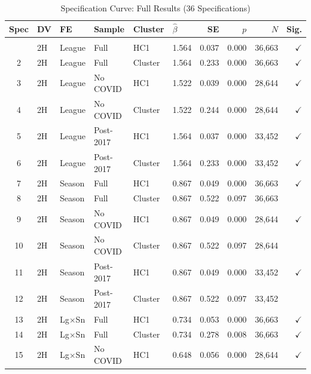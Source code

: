 
\begin{table}[htbp]
\centering
\begin{threeparttable}
\caption{Specification Curve: Full Results (36 Specifications)}
\label{tab:spec_curve_full}
\small
\begin{tabular}{clllllrrrr}
\toprule
Spec & DV & FE & Sample & Cluster & $\hat{\beta}$ & SE & $p$ & $N$ & Sig. \\
\midrule
\addlinespace
\multicolumn{10}{l}{\textit{Panel A: 2H stoppage time}} \\
\addlinespace[3pt]
1 & 2H & League & Full & HC1 & 1.564 & 0.037 & 0.000 & 36,663 & $\checkmark$ \\
2 & 2H & League & Full & Cluster & 1.564 & 0.233 & 0.000 & 36,663 & $\checkmark$ \\
3 & 2H & League & No COVID & HC1 & 1.522 & 0.039 & 0.000 & 28,644 & $\checkmark$ \\
4 & 2H & League & No COVID & Cluster & 1.522 & 0.244 & 0.000 & 28,644 & $\checkmark$ \\
5 & 2H & League & Post-2017 & HC1 & 1.564 & 0.037 & 0.000 & 33,452 & $\checkmark$ \\
6 & 2H & League & Post-2017 & Cluster & 1.564 & 0.233 & 0.000 & 33,452 & $\checkmark$ \\
7 & 2H & Season & Full & HC1 & 0.867 & 0.049 & 0.000 & 36,663 & $\checkmark$ \\
8 & 2H & Season & Full & Cluster & 0.867 & 0.522 & 0.097 & 36,663 & \\
9 & 2H & Season & No COVID & HC1 & 0.867 & 0.049 & 0.000 & 28,644 & $\checkmark$ \\
10 & 2H & Season & No COVID & Cluster & 0.867 & 0.522 & 0.097 & 28,644 & \\
11 & 2H & Season & Post-2017 & HC1 & 0.867 & 0.049 & 0.000 & 33,452 & $\checkmark$ \\
12 & 2H & Season & Post-2017 & Cluster & 0.867 & 0.522 & 0.097 & 33,452 & \\
13 & 2H & Lg$\times$Sn & Full & HC1 & 0.734 & 0.053 & 0.000 & 36,663 & $\checkmark$ \\
14 & 2H & Lg$\times$Sn & Full & Cluster & 0.734 & 0.278 & 0.008 & 36,663 & $\checkmark$ \\
15 & 2H & Lg$\times$Sn & No COVID & HC1 & 0.648 & 0.056 & 0.000 & 28,644 & $\checkmark$ \\

\end{tabular}
\end{threeparttable}
\end{table}
